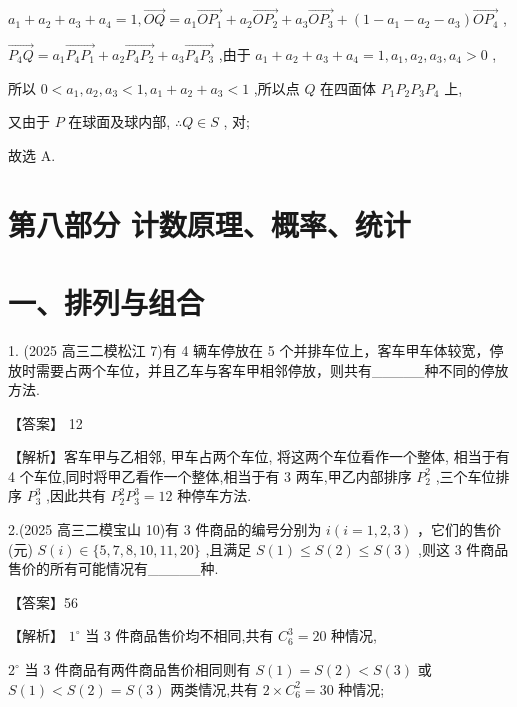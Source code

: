 \documentclass[10pt]{article}
\newcommand*\circled[1]{\tikz[baseline=(char.base)]{\node[shape=circle,draw,inner sep=1.5pt] (char) {\small #1};}}
\begin{document}
\({a}_{1} + {a}_{2} + {a}_{3} + {a}_{4} = 1,\overrightarrow{OQ} = {a}_{1}\overrightarrow{O{P}_{1}} + {a}_{2}\overrightarrow{O{P}_{2}} + {a}_{3}\overrightarrow{O{P}_{3}} + \left( {1 - {a}_{1} - {a}_{2} - {a}_{3}}\right) \overrightarrow{O{P}_{4}}\) ,

\(\overrightarrow{{P}_{4}Q} = {a}_{1}\overrightarrow{{P}_{4}{P}_{1}} + {a}_{2}\overrightarrow{{P}_{4}{P}_{2}} + {a}_{3}\overrightarrow{{P}_{4}{P}_{3}}\) ,由于 \({a}_{1} + {a}_{2} + {a}_{3} + {a}_{4} = 1,{a}_{1},{a}_{2},{a}_{3},{a}_{4} > 0\) ,

所以 \(0 < {a}_{1},{a}_{2},{a}_{3} < 1,{a}_{1} + {a}_{2} + {a}_{3} < 1\) ,所以点 \(Q\) 在四面体 \({P}_{1}{P}_{2}{P}_{3}{P}_{4}\) 上,

又由于 \(P\) 在球面及球内部, \(\therefore Q \in  S\) , \circled{2} 对;

故选 A.

\section*{第八部分 计数原理、概率、统计}

\section*{一、排列与组合}

1. (2025 高三二模松江 7)有 4 辆车停放在 5 个并排车位上，客车甲车体较宽，停放时需要占两个车位，并且乙车与客车甲相邻停放，则共有\_\_\_\_\_种不同的停放方法.

【答案】 12

【解析】客车甲与乙相邻, 甲车占两个车位, 将这两个车位看作一个整体, 相当于有 4 个车位,同时将甲乙看作一个整体,相当于有 3 两车,甲乙内部排序 \({P}_{2}^{2}\) ,三个车位排序 \({P}_{3}^{3}\) ,因此共有 \({P}_{2}^{2}{P}_{3}^{3} = {12}\) 种停车方法.

2.(2025 高三二模宝山 10)有 3 件商品的编号分别为 \(i\left( {i = 1,2,3}\right)\) ，它们的售价(元) \(S\left( i\right)  \in  \{ 5,7,8,{10},{11},{20}\}\) ,且满足 \(S\left( 1\right)  \leq  S\left( 2\right)  \leq  S\left( 3\right)\) ,则这 3 件商品售价的所有可能情况有\_\_\_\_\_种.

【答案】56

【解析】 \({1}^{ \circ  }\) 当 3 件商品售价均不相同,共有 \({C}_{6}^{3} = {20}\) 种情况,

\({2}^{ \circ  }\) 当 3 件商品有两件商品售价相同则有 \(S\left( 1\right)  = S\left( 2\right)  < S\left( 3\right)\) 或 \(S\left( 1\right)  < S\left( 2\right)  = S\left( 3\right)\) 两类情况,共有 \(2 \times  {C}_{6}^{2} = {30}\) 种情况;
\end{document}
